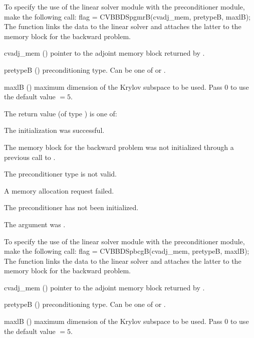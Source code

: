 {}
To specify the use of the {\cvspgmr} linear solver module with the {\cvbbdpre} 
preconditioner module, make the following call:
{
  flag = CVBBDSpgmrB(cvadj\_mem, pretypeB, maxlB);
}
{
  The function  links the {\cvbbdpre} data to the
  {\cvspgmr} linear solver and attaches the latter to the {\cvodes}
  memory block for the backward problem.
}
{
  \begin{args}
  \item[cvadj\_mem] ()
    pointer to the adjoint memory block returned by .
  \item[pretypeB] ()
    preconditioning type. Can be one of  or .
  \item[maxlB] ()
    maximum dimension of the Krylov subspace to be used. Pass $0$ to use the 
    default value $=5$.
  \end{args}
}
{
  The return value  (of type ) is one of:
  \begin{args}
  \item[\Id{CVSPGMR\_SUCCESS}] 
    The {\cvspgmr} initialization was successful.
  \item[\Id{CVSPGMR\_MEM\_NULL}]
    The {\cvodes} memory block for the backward problem was not initialized through a 
    previous call to .
  \item[\Id{CVSPGMR\_ILL\_INPUT}]
    The preconditioner type  is not valid.
  \item[\Id{CVSPGMR\_MEM\_FAIL}]
    A memory allocation request failed.
  \item[\Id{CVBBDPRE\_PDATA\_NULL}]
    The {\cvbbdpre} preconditioner has not been initialized.
  \item[\Id{CVBBDPRE\_ADJMEM\_NULL}]
    The  argument was .
  \end{args}
}
{}
To specify the use of the {\cvspbcg} linear solver module with the {\cvbbdpre} 
preconditioner module, make the following call:
{
  flag = CVBBDSpbcgB(cvadj\_mem, pretypeB, maxlB);
}
{
  The function  links the {\cvbbdpre} data to the
  {\cvspbcg} linear solver and attaches the latter to the {\cvodes}
  memory block for the backward problem.
}
{
  \begin{args}
  \item[cvadj\_mem] ()
    pointer to the adjoint memory block returned by .
  \item[pretypeB] ()
    preconditioning type. Can be one of  or .
  \item[maxlB] ()
    maximum dimension of the Krylov subspace to be used. Pass $0$ to use the 
    default value $=5$.
  \end{args}
}
